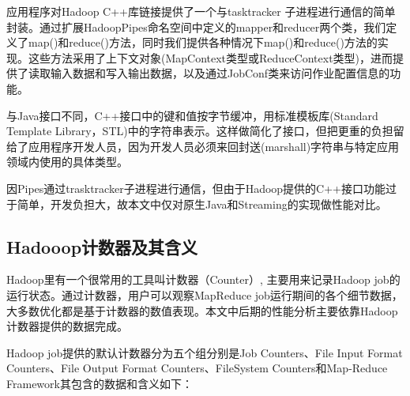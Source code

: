 应用程序对Hadoop C++库链接提供了一个与tasktracker 子进程进行通信的简单封装。通过扩展HadoopPipes命名空间中定义的mapper和reducer两个类，我们定义了map()和reduce()方法，同时我们提供各种情况下map()和reduce()方法的实现。这些方法采用了上下文对象(MapContext类型或ReduceContext类型)，进而提供了读取输入数据和写入输出数据，以及通过JobConf类来访问作业配置信息的功能。

与Java接口不同，C++接口中的键和值按字节缓冲，用标准模板库(Standard Template Library，STL)中的字符串表示。这样做简化了接口，但把更重的负担留给了应用程序开发人员，因为开发人员必须来回封送(marshall)字符串与特定应用领域内使用的具体类型。

因Pipes通过trasktracker子进程进行通信，但由于Hadoop提供的C++接口功能过于简单，开发负担大，故本文中仅对原生Java和Streaming的实现做性能对比。

\subsection[Hadooop计数器及其含义]{Hadooop计数器及其含义\cite{site:hadoop-counter}}
Hadoop里有一个很常用的工具叫计数器（Counter）, 主要用来记录Hadoop job的运行状态。通过计数器，用户可以观察MapReduce job运行期间的各个细节数据，大多数优化都是基于计数器的数值表现。本文中后期的性能分析主要依靠Hadoop计数器提供的数据完成。

Hadoop job提供的默认计数器分为五个组分别是Job Counters、File Input Format Counters、File Output Format Counters、FileSystem Counters和Map-Reduce Framework其包含的数据和含义如下：

